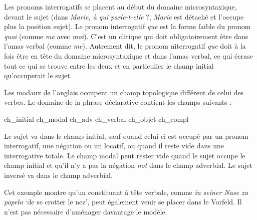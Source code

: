 {     Les pronoms interrogatifs se placent au début du domaine microsyntaxique, devant le sujet (dans \textit{Marie, à qui parle-t-elle} ?, \textit{Marie} est détaché et l’occupe plus la position sujet). Le pronom interrogatif \textit{que} est la forme faible du pronom \textit{quoi} (comme \textit{me} avec \textit{moi}). C’est un clitique qui doit obligatoirement être dans l’amas verbal (comme \textit{me}). Autrement dit, le pronom niterrogatif \textit{que} doit à la fois être en tête du domaine microsyntaxique et dans l’amas verbal, ce qui écrase tout ce qui se trouve entre les deux et en particulier le champ initial qu’occuperait le sujet.

     Les modaux de l’anglais occupent un champ topologique différent de celui des verbes. Le domaine de la phrase déclarative contient les champs suivants :

    ch\_initial {\textbar} ch\_modal {\textbar} ch\_adv {\textbar} ch\_verbal {\textbar} ch\_objet {\textbar} ch\_compl

    Le sujet va dans le champ initial, sauf quand celui-ci est occupé par un pronom interrogatif, une négation ou un locatif, ou quand il reste vide dans une interrogative totale. Le champ modal peut rester vide quand le sujet occupe le champ initial et qu’il n’y a pas la négation \textit{not} dans le champ adverbial. Le sujet inversé va dans le champ adverbial.

     Cet exemple montre qu’un constituant à tête verbale, comme \textit{in seiner Nase zu popeln} ‘de se crotter le nez’, peut également venir se placer dans le Vorfeld. Il n’est pas nécessaire d’aménager davantage le modèle.
}
